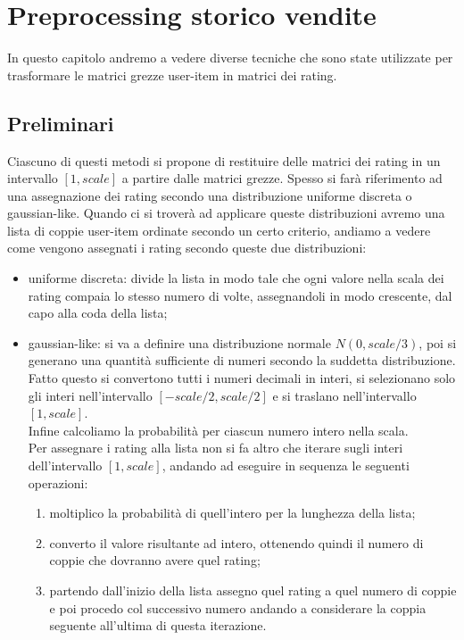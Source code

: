 
\hypertarget{(chap:capitolo5)}{}
\chapter{Preprocessing storico vendite}
In questo capitolo andremo a vedere diverse tecniche che sono state utilizzate per trasformare le matrici grezze user-item in matrici dei rating.\\

\section{Preliminari}
Ciascuno di questi metodi si propone di restituire delle matrici dei rating in un intervallo $[1,scale]$ a partire dalle matrici grezze. Spesso si farà riferimento ad una assegnazione dei rating secondo una distribuzione uniforme discreta o gaussian-like. Quando ci si troverà ad applicare queste distribuzioni avremo una lista di coppie user-item ordinate secondo un certo criterio, andiamo a vedere come vengono assegnati i rating secondo queste due distribuzioni:
\begin{itemize}
    \item uniforme discreta: divide la lista in modo tale che ogni valore nella scala dei rating compaia lo stesso numero di volte, assegnandoli in modo crescente, dal capo alla coda della lista;
    \item gaussian-like: si va a definire una distribuzione normale $N(0,scale/3)$, poi si generano una quantità sufficiente di numeri secondo la suddetta distribuzione. Fatto questo si convertono tutti i numeri decimali in interi, si selezionano solo gli interi nell'intervallo $[-scale/2,scale/2]$ e si traslano nell'intervallo $[1,scale]$.\\
    Infine calcoliamo la probabilità per ciascun numero intero nella scala.\\
    Per assegnare i rating alla lista non si fa altro che iterare sugli interi dell'intervallo $[1,scale]$, andando ad eseguire in sequenza le seguenti operazioni:
    \begin{enumerate}
        \item moltiplico la probabilità di quell'intero per la lunghezza della lista;
        \item converto il valore risultante ad intero, ottenendo quindi il numero di coppie che dovranno avere quel rating;
        \item partendo dall'inizio della lista assegno quel rating a quel numero di coppie e poi procedo col successivo numero andando a considerare la coppia seguente all'ultima di questa iterazione.
    \end{enumerate}
\end{itemize}

